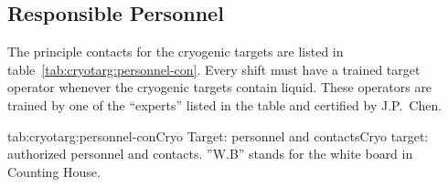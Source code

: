 \begin{safetyen}{10}{15} 
\subsection{Responsible Personnel}

The principle contacts for the cryogenic targets are listed in table~\ref{tab:cryotarg:personnel-con}.
Every shift must have a trained target operator whenever the cryogenic
targets contain liquid. These operators are trained by one of the
``experts'' listed in the table and certified by J.P.~Chen.

\begin{namestab}{tab:cryotarg:personnel-con}{Cryo Target: personnel
and contacts}{Cryo target: authorized personnel and contacts. ''W.B''
stands for the white board in Counting House.}      
 \DaveMeekins{} \ChristopherKeith{}
 
 \end{namestab}
\end{safetyen}
\clearpage
